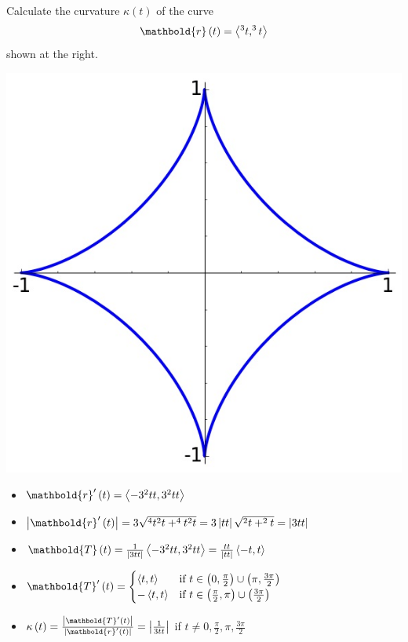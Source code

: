 \documentclass[answers,12pt,addpoints]{exam}
\let\cos\relax\DeclareMathOperator{\cos}{\mathsf{cos}}
\let\sin\relax\DeclareMathOperator{\sin}{\mathsf{sin}}
\begin{document}
\begin{questions}
\ifprintanswers\else\begin{multicols}{2}\fi
\question[30] Calculate the curvature
$\kappa\left(t\right)$ of the curve
\[\mathbold{r}\left(t\right)
=\left\langle\cos^3{t},\sin^3{t}
\right\rangle\]
\ifprintanswers\else
shown at the right.
\begin{center}\includegraphics[scale=.4]{Astroid}\end{center}
\end{multicols}\fi
\begin{solution}
\begin{itemize}
\item $\mathbold{r}'\left(t\right)=
\left\langle -3\cos^2{t}\sin{t},3\sin^2{t}\cos{t}
\right\rangle$
\item $\left|\mathbold{r}'\left(t\right)\right|=
3\sqrt{\cos^4{t}\sin^2{t}+\sin^4{t}\cos^2{t}}
=3\left|\cos{t}\sin{t}\right|\sqrt{\sin^2{t}+\cos^2{t}}
=\left|3\cos{t}\sin{t}\right|$
\item $\mathbold{T}\left(t\right)
=\frac{1}{\left|3\cos{t}\sin{t}\right|}
\left\langle -3\cos^2{t}\sin{t},3\sin^2{t}\cos{t}
\right\rangle
=\frac{\sin{t}\cos{t}}{\left|\sin{t}\cos{t}\right|}
\left\langle -\cos{t},\sin{t}\right\rangle$
\item $\mathbold{T}'\left(t\right)
=\begin{cases}
\left\langle\sin{t},\cos{t}\right\rangle
&\text{if $t\in\left(0,\frac{\pi}{2}\right)
\cup\left(\pi,\frac{3\pi}{2}\right)$}\\
-\left\langle\sin{t},\cos{t}\right\rangle
&\text{if $t\in\left(\frac{\pi}{2},\pi\right)
\cup\left(\frac{3\pi}{2}\right)$}\\
\end{cases}$
\item $\kappa\left(t\right)
=\frac{\left|\mathbold{T}'\left(t\right)\right|}
{\left|\mathbold{r}'\left(t\right)\right|}
=\left|\frac{1}{3\sin{t}\cos{t}}\right|$
if $t\ne 0,\frac{\pi}{2},\pi,\frac{3\pi}{2}$
\end{itemize}
\end{solution}

\end{questions}
\end{document}
